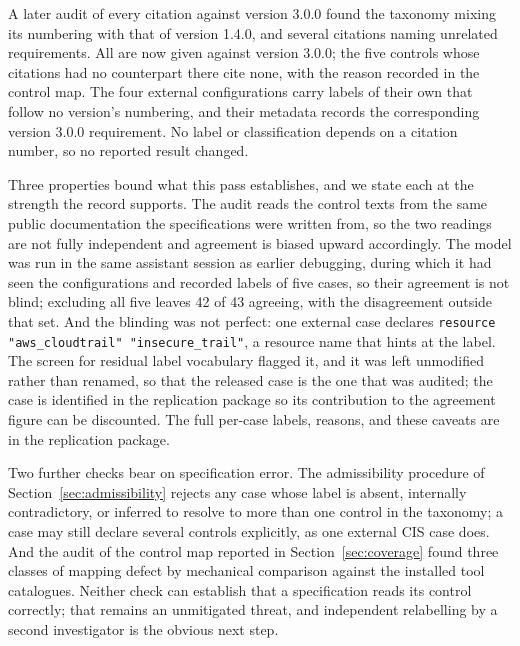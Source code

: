 \documentclass[smallextended]{svjour3}
\begin{document}
A later audit of every citation against version 3.0.0 \citep{cis2024aws} found the
taxonomy mixing its numbering with that of version 1.4.0, and several citations
naming unrelated requirements. All are now given against version 3.0.0; the five
controls whose citations had no counterpart there cite none, with the reason
recorded in the control map. The four external configurations carry labels of
their own that follow no version's numbering, and their metadata records the
corresponding version 3.0.0 requirement. No label or classification depends on a
citation number, so no reported result changed.

Three properties bound what this pass establishes, and we state each at the
strength the record supports. The audit reads the control texts from the same
public documentation the specifications were written from, so the two readings
are not fully independent and agreement is biased upward accordingly. The model
was run in the same assistant session as earlier debugging, during which it had
seen the configurations and recorded labels of five cases, so their agreement is
not blind; excluding all five leaves 42 of 43
agreeing, with the disagreement outside that set. And the blinding was not
perfect: one external case declares \texttt{resource "aws\_cloudtrail"
"insecure\_trail"}, a resource name that hints at the label. The screen for
residual label vocabulary flagged it, and it was left unmodified rather than renamed, so that the released
case is the one that was audited; the case is identified in the replication
package so its contribution to the agreement figure can be discounted. The full
per-case labels, reasons, and these caveats are in the replication package.

Two further checks bear on specification error. The admissibility procedure of
Section~\ref{sec:admissibility} rejects any case whose label is absent,
internally contradictory, or inferred to resolve to more than one control in the
taxonomy; a case may still declare several controls explicitly, as one external
CIS case does.
And the audit of the control map reported in Section~\ref{sec:coverage} found
three classes of mapping defect by mechanical comparison against the installed
tool catalogues. Neither check can establish that a specification reads its
control correctly; that remains an unmitigated threat, and independent
relabelling by a second investigator is the obvious next step.
\end{document}
